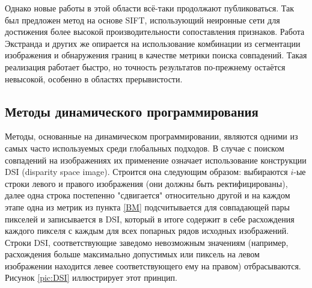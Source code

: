 Однако новые работы в этой области всё-таки продолжают публиковаться. Так был предложен метод на основе SIFT, использующий неиронные сети для 	
достижения более высокой производительности \cite{modsift} сопоставления признаков.   Работа Экстранда и других \cite{ekstrand2015high} же опирается на 
использование комбинации из сегментации изображения и обнаружения границ в качестве метрики поиска совпадений. Такая реализация работает быстро, но точность 
результатов по-прежнему остаётся невысокой, особенно в областях прерывистости. %

\subsection{Методы динамического программирования}
Методы, основанные на динамическом программировании, являются одними из самых часто используемых среди глобальных подходов.  
В случае с поиском совпадений на изображениях их применение означает использование конструкции DSI (disparity space image). Строится она следующим образом: 
выбираются $i$-ые строки левого и правого изображения (они должны быть ректифицированы), далее одна строка постепенно "сдвигается" относительно другой и
на каждом этапе одна из метрик из пункта \ref{BM} подсчитывается для совпадающей пары пикселей и записывается в DSI, который в итоге содержит в себе расхождения каждого пикселя 
с каждым для всех попарных рядов исходных изображений. Строки DSI, соответствующие заведомо невозможным значениям (например, расхождения больше максимально допустимых или пиксель на 
левом изображении находится левее соответствующего ему на правом) отбрасываются. Рисунок \ref{pic:DSI} \cite{DSI} иллюстрирует этот принцип. 
